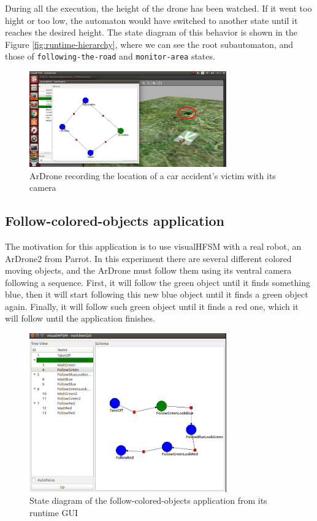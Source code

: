 \documentclass[journal,twoside]{JoPhA}
\begin{document}
During all the execution, the height of the drone has been watched. If it went too hight or too low, the automaton would have switched to another state until it reaches the desired height. The state diagram of this behavior is shown in the Figure \ref{fig:runtime-hierarchy}, where we can see the root subautomaton, and those of \texttt{following-the-road} and  \texttt{monitor-area} states. 

\begin{figure}[ht!]
\begin{center}
        \includegraphics[width=8.5cm]{figs/watchPerson.png}
\end{center}
\caption{ArDrone recording the location of a car accident's victim with its camera}
\label{fig:watchPerson} 
\end{figure}



\subsection{Follow-colored-objects application}

The motivation for this application is to use visualHFSM with a real robot, an ArDrone2 from Parrot. In this experiment there are several different colored moving objects, and the ArDrone must follow them using its ventral camera following a sequence. First, it will follow the green object until it finds something blue, then it will start following this new blue object until it finds a green object again. Finally, it will follow such green object until it finds a red one, which it will follow until the application finishes.

\begin{figure}[ht!]
\begin{center}
        \includegraphics[width=8.5cm]{figs/colorsStatesGUI.png}
\end{center}
\caption{State diagram of the follow-colored-objects application from its runtime GUI}
\label{fig:statesColors}
\end{figure}
\end{document}

